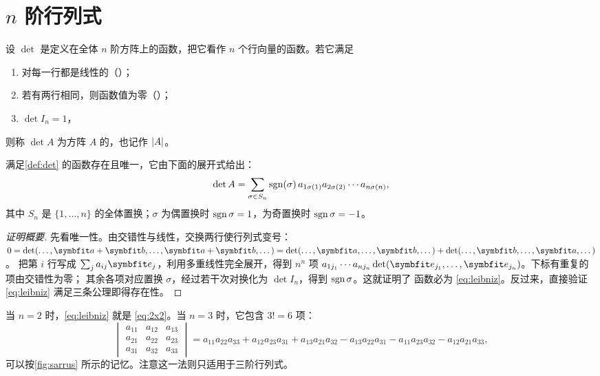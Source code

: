 \section{\texorpdfstring{$n$}{n} 阶行列式}\label{sec:det}

\begin{definition}\label{def:det}
设 $\det$ 是定义在全体 $n$ 阶方阵上的函数，把它看作 $n$ 个行向量的函数。若它满足
\begin{enumerate}
  \item 对每一行都是线性的（）；
  \item 若有两行相同，则函数值为零（）；
  \item $\det I_n=1$，
\end{enumerate}
则称 $\det A$ 为方阵 $A$ 的，也记作 $\lvert A\rvert$。
\end{definition}

\begin{theorem}\label{thm:leibniz}
满足\cref{def:det} 的函数存在且唯一，它由下面的展开式给出：
\begin{equation}\label{eq:leibniz}
  \det A=\sum_{\sigma\in S_n}\operatorname{sgn}(\sigma)\,a_{1\sigma(1)}a_{2\sigma(2)}\dotsm a_{n\sigma(n)},
\end{equation}
其中 $S_n$ 是 $\{1,\dotsc,n\}$ 的全体置换；$\sigma$ 为偶置换时 $\operatorname{sgn}\sigma=1$，为奇置换时 $\operatorname{sgn}\sigma=-1$。
\end{theorem}

\begin{proof}[证明概要]
先看唯一性。由交错性与线性，交换两行使行列式变号：
$0=\det(\dotsc,\vb{a}+\vb{b},\dotsc,\vb{a}+\vb{b},\dotsc)=\det(\dotsc,\vb{a},\dotsc,\vb{b},\dotsc)+\det(\dotsc,\vb{b},\dotsc,\vb{a},\dotsc)$。
把第 $i$ 行写成 $\sum_ja_{ij}\vb{e}_j$，利用多重线性完全展开，得到 $n^n$ 项
$a_{1j_1}\dotsm a_{nj_n}\det(\vb{e}_{j_1},\dotsc,\vb{e}_{j_n})$。下标有重复的项由交错性为零；
其余各项对应置换 $\sigma$，经过若干次对换化为 $\det I_n$，得到 $\operatorname{sgn}\sigma$。这就证明了
函数必为 \cref{eq:leibniz}。反过来，直接验证 \cref{eq:leibniz} 满足三条公理即得存在性。
\end{proof}

当 $n=2$ 时，\cref{eq:leibniz} 就是 \cref{eq:2x2}。当 $n=3$ 时，它包含 $3!=6$ 项：
\[
\begin{vmatrix}a_{11}&a_{12}&a_{13}\\a_{21}&a_{22}&a_{23}\\a_{31}&a_{32}&a_{33}\end{vmatrix}
=a_{11}a_{22}a_{33}+a_{12}a_{23}a_{31}+a_{13}a_{21}a_{32}
-a_{13}a_{22}a_{31}-a_{11}a_{23}a_{32}-a_{12}a_{21}a_{33},
\]
可以按\cref{fig:sarrus} 所示的记忆。注意这一法则只适用于三阶行列式。


